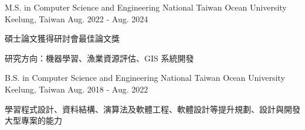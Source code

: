 

\begin{cventries}

  \cventry
    {M.S. in Computer Science and Engineering} %
    {National Taiwan Ocean University} %
    {Keelung, Taiwan} %
    {Aug. 2022 - Aug. 2024} %
    {
      \begin{cvitems} %
        \item {碩士論文獲得研討會最佳論文獎}
        \item {研究方向：機器學習、漁業資源評估、GIS 系統開發}
      \end{cvitems}
    }

  \cventry
    {B.S. in Computer Science and Engineering} %
    {National Taiwan Ocean University} %
    {Keelung, Taiwan} %
    {Aug. 2018 - Aug. 2022} %
    {
      \begin{cvitems} %
        \item {學習程式設計、資料結構、演算法及軟體工程、軟體設計等提升規劃、設計與開發大型專案的能力}
      \end{cvitems}
    }

\end{cventries}
